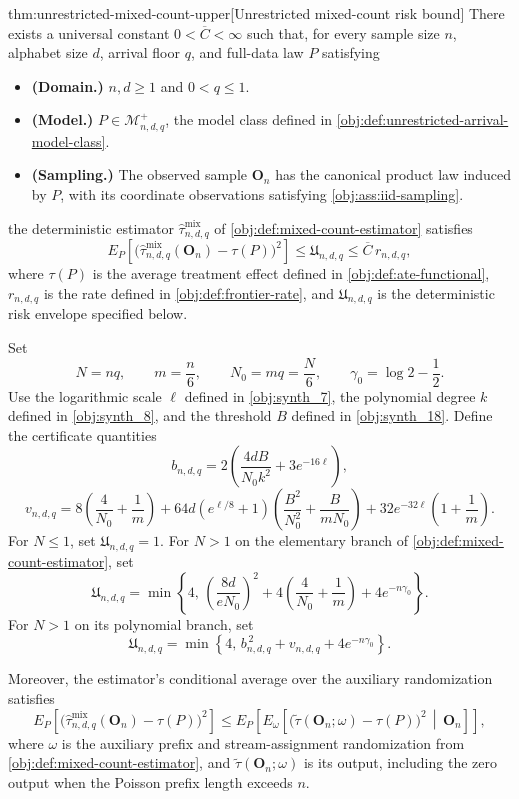 \begin{theoremv}{thm:unrestricted-mixed-count-upper}[Unrestricted mixed-count risk bound]
There exists a universal constant \(0<\overline C<\infty\) such that, for every sample size \(n\), alphabet size \(d\), arrival floor \(q\), and full-data law \(P\) satisfying
\begin{itemize}
\item \textbf{(Domain.)} \(n,d\ge1\) and \(0<q\le1\).
\item \textbf{(Model.)} \(P\in\mathcal M^{+}_{n,d,q}\), the model class defined in \cref{obj:def:unrestricted-arrival-model-class}.
\item \textbf{(Sampling.)} The observed sample \(\mathbf O_n\) has the canonical product law induced by \(P\), with its coordinate observations satisfying \cref{obj:ass:iid-sampling}.
\end{itemize}
the deterministic estimator \(\widehat\tau^{\mathrm{mix}}_{n,d,q}\) of \cref{obj:def:mixed-count-estimator} satisfies
\[
E_P\!\left[
 \bigl(\widehat\tau^{\mathrm{mix}}_{n,d,q}(\mathbf O_n)-\tau(P)\bigr)^2
\right]
\le \mathfrak U_{n,d,q}
\le \overline C\,r_{n,d,q},
\]
where \(\tau(P)\) is the average treatment effect defined in \cref{obj:def:ate-functional}, \(r_{n,d,q}\) is the rate defined in \cref{obj:def:frontier-rate}, and \(\mathfrak U_{n,d,q}\) is the deterministic risk envelope specified below.

Set
\[
N=nq,\qquad m=\frac n6,\qquad N_0=mq=\frac N6,
\qquad \gamma_0=\log 2-\frac12.
\]
Use the logarithmic scale \(\ell\) defined in \cref{obj:synth_7}, the polynomial degree \(k\) defined in \cref{obj:synth_8}, and the threshold \(B\) defined in \cref{obj:synth_18}. Define the certificate quantities
\[
b_{n,d,q}
=2\left(\frac{4dB}{N_0k^2}+3e^{-16\ell}\right),
\]
\[
v_{n,d,q}
=8\left(\frac4{N_0}+\frac1m\right)
+64d\left(e^{\ell/8}+1\right)
 \left(\frac{B^2}{N_0^2}+\frac{B}{mN_0}\right)
+32e^{-32\ell}\left(1+\frac1m\right).
\]
For \(N\le1\), set \(\mathfrak U_{n,d,q}=1\). For \(N>1\) on the elementary branch of \cref{obj:def:mixed-count-estimator}, set
\[
\mathfrak U_{n,d,q}
=\min\left\{
4,\,
\left(\frac{8d}{eN_0}\right)^2
+4\left(\frac4{N_0}+\frac1m\right)
+4e^{-n\gamma_0}
\right\}.
\]
For \(N>1\) on its polynomial branch, set
\[
\mathfrak U_{n,d,q}
=\min\left\{
4,\,
b_{n,d,q}^{\,2}+v_{n,d,q}+4e^{-n\gamma_0}
\right\}.
\]

Moreover, the estimator's conditional average over the auxiliary randomization satisfies
\[
E_P\!\left[
 \bigl(\widehat\tau^{\mathrm{mix}}_{n,d,q}(\mathbf O_n)-\tau(P)\bigr)^2
\right]
\le
E_P\!\left[
 E_{\omega}\!\left[
  \bigl(\widetilde\tau(\mathbf O_n;\omega)-\tau(P)\bigr)^2
  \,\middle|\,\mathbf O_n
 \right]
\right],
\]
where \(\omega\) is the auxiliary prefix and stream-assignment randomization from \cref{obj:def:mixed-count-estimator}, and \(\widetilde\tau(\mathbf O_n;\omega)\) is its output, including the zero output when the Poisson prefix length exceeds \(n\).
\end{theoremv}

